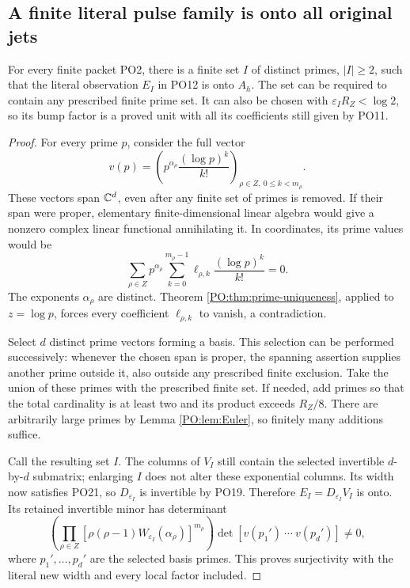 \subsection{A finite literal pulse family is onto all original jets}

\begin{theorem}
\label{PO:thm:onto}
For every finite packet PO2, there is a finite set \(I\) of
distinct primes, \(|I|\ge2\), such that the literal observation
\(E_I\) in PO12 is onto \(A_h\).
The set can be required to contain any prescribed finite prime
set. It can also be chosen with
\(\varepsilon_I R_Z<\log2\), so its bump factor is a proved unit
with all its coefficients still given by PO11.
\end{theorem}
\begin{proof}
For every prime \(p\), consider the full vector
\[
 v(p)=
 \left(p^{\alpha_\rho}
            \frac{(\log p)^k}{k!}\right)_{\rho\in Z,\ 0\le k<m_\rho}.
 \tag{PO27}\label{PO:po:prime-columns}
\]
These vectors span \(\mathbb C^d\), even after any finite set of
primes is removed. If their span were proper, elementary
finite-dimensional linear algebra would give a nonzero
complex linear functional annihilating it. In coordinates,
its prime values would be
\[
 \sum_{\rho\in Z}p^{\alpha_\rho}
       \sum_{k=0}^{m_\rho-1}\ell_{\rho,k}
                           \frac{(\log p)^k}{k!}=0 .
 \tag{PO28}
\]
The exponents \(\alpha_\rho\) are distinct. Theorem
\ref{PO:thm:prime-uniqueness}, applied to \(z=\log p\), forces
every coefficient \(\ell_{\rho,k}\) to vanish, a contradiction.

Select \(d\) distinct prime vectors forming a basis. This
selection can be performed successively: whenever the
chosen span is proper, the spanning assertion supplies
another prime outside it, also outside any prescribed finite
exclusion. Take the union of these primes with the prescribed
finite set. If needed, add primes so that the total cardinality
is at least two and its product exceeds \(R_Z/8\). There
are arbitrarily large primes by Lemma \ref{PO:lem:Euler}, so
finitely many additions suffice.

Call the resulting set \(I\). The columns of \(V_I\) still
contain the selected invertible \(d\)-by-\(d\) submatrix;
enlarging \(I\) does not alter these exponential columns.
Its width now satisfies PO21, so \(D_{\varepsilon_I}\) is
invertible by PO19. Therefore \(E_I=D_{\varepsilon_I}V_I\) is
onto. Its retained invertible minor has determinant
\[
 \left(\prod_{\rho\in Z}
 [\rho(\rho-1)W_{\varepsilon_I}(\alpha_\rho)]^{m_\rho}\right)
       \det[v(p_1')\ \cdots\ v(p_d')]\ne0,
 \tag{PO29}\label{PO:po:minor}
\]
where \(p_1',\ldots,p_d'\) are the selected basis primes.
This proves surjectivity with the literal new width and every
local factor included.
\end{proof}

